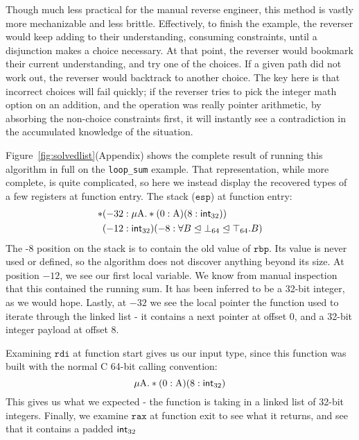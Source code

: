 Though much less practical for the manual reverse engineer, this method is vastly more mechanizable and less brittle. Effectively, to finish the example, the reverser would keep adding to their understanding, consuming constraints, until a disjunction makes a choice necessary. At that point, the reverser would bookmark their current understanding, and try one of the choices. If a given path did not work out, the reverser would backtrack to another choice. The key here is that incorrect choices will fail quickly; if the reverser tries to pick the integer math option on an addition, and the operation was really pointer arithmetic, by absorbing the non-choice constraints first, it will instantly see a contradiction in the accumulated knowledge of the situation.

Figure~\ref{fig:solvedlist}(Appendix) shows the complete result of running this algorithm in full on the \texttt{loop\_sum} example. That representation, while more complete, is quite complicated, so here we instead display the recovered types of a few registers at function entry. The stack ($\texttt{esp}$) at function entry:
\begin{align*}
*&(-32 : \mu \textrm{A}. *(0:\textrm{A})(8:\mathsf{int}_{32}))\\
&(-12 : \mathsf{int}_{32})(-8:\forall B\mathrel{\unlhd} \bot_{64}\mathrel{\unlhd} \top_{64}.B)
\end{align*}
The -8 position on the stack is to contain the old value of $\texttt{rbp}$. Its value is never used or defined, so the algorithm does not discover anything beyond its size. At position $-12$, we see our first local variable. We know from manual inspection that this contained the running sum. It has been inferred to be a 32-bit integer, as we would hope. Lastly, at $-32$ we see the local pointer the function used to iterate through the linked list - it contains a next pointer at offset 0, and a 32-bit integer payload at offset 8.

Examining $\texttt{rdi}$ at function start gives us our input type, since this function was built with the normal C 64-bit calling convention:
$$\mu \textrm{A}. *(0:\textrm{A})(8:\mathsf{int}_{32})$$
This gives us what we expected - the function is taking in a linked list of 32-bit integers. Finally, we examine $\texttt{rax}$ at function exit to see what it returns, and see that it contains a padded $\mathsf{int}_{32}$
